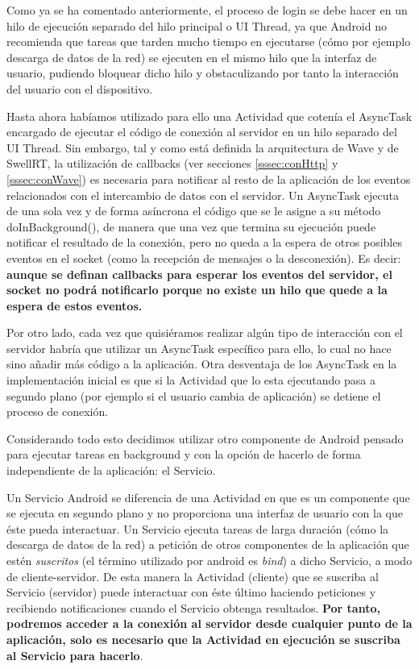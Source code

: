     Como ya se ha comentado anteriormente, el proceso de login se debe hacer en un hilo de ejecución separado del hilo principal o UI Thread, ya que Android no recomienda\cite{ref:android_processes} que tareas que tarden mucho tiempo en ejecutarse (cómo por ejemplo descarga de datos de la red) se ejecuten en el mismo hilo que la interfaz de usuario, pudiendo bloquear dicho hilo y obstaculizando por tanto la interacción del usuario con el dispositivo.
      
    Hasta ahora habíamos utilizado para ello una Actividad que cotenía el AsyncTask \cite{ref:android_asynctask} encargado de ejecutar el código de conexión al servidor en un hilo separado del UI Thread. Sin embargo, tal y como está definida la arquitectura de Wave y de SwellRT, la utilización de callbacks (ver secciones \ref{sssec:conHttp} y \ref{sssec:conWave}) es necesaria para notificar al resto de la aplicación de los eventos relacionados con el intercambio de datos con el servidor. Un AsyncTask ejecuta de una sola vez y de forma asíncrona el código que se le asigne a su método doInBackground(), de manera que una vez que termina su ejecución puede notificar el resultado de la conexión, pero no queda a la espera de otros posibles eventos en el socket (como la recepción de mensajes o la desconexión). Es decir: \textbf{aunque se definan callbacks para esperar los eventos del servidor, el socket no podrá notificarlo porque no existe un hilo que quede a la espera de estos eventos.}

    Por otro lado, cada vez que quisiéramos realizar algún tipo de interacción con el servidor habría que utilizar un AsyncTask específico para ello, lo cual no hace sino añadir más código a la aplicación. Otra desventaja de los AsyncTask en la implementación inicial es que si la Actividad que lo esta ejecutando pasa a segundo plano (por ejemplo si el usuario cambia de aplicación) se detiene el proceso de conexión. 

    Considerando todo esto decidimos utilizar otro componente de Android pensado para ejecutar tareas en background y con la opción de hacerlo de forma independiente de la aplicación: el Servicio\cite{ref:android_service}.

    Un Servicio Android se diferencia de una Actividad en que es un componente que se ejecuta en segundo plano y no proporciona una interfaz de usuario con la que éste pueda interactuar. Un Servicio ejecuta tareas de larga duración (cómo la descarga de datos de la red) a petición de otros componentes de la aplicación que estén \textit{suscritos} (el término utilizado por android es \textit{bind}) a dicho Servicio, a modo de cliente-servidor. De esta manera la Actividad (cliente) que se suscriba al Servicio (servidor) puede interactuar con éste último haciendo peticiones y recibiendo notificaciones cuando el Servicio obtenga resultados. \textbf{Por tanto, podremos acceder a la conexión al servidor desde cualquier punto de la aplicación, solo es necesario que la Actividad en ejecución se suscriba al Servicio para hacerlo}. 
    
